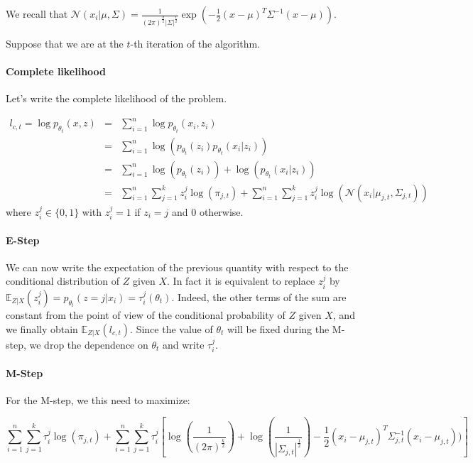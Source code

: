 \documentclass[12pt]{report}
\begin{document}
We recall that
$\mathcal{N}(x_i|\mu,\Sigma)=\frac{1}{(2\pi)^{\frac{d}{2}}|\Sigma|^{\frac{1}{2}}}\exp(-\frac{1}{2}(x-\mu)^T
\Sigma^{-1}(x-\mu))$.

\newpage
Suppose that we are at the $t$-th iteration of the algorithm.
\paragraph{Complete likelihood} Let's write the complete likelihood of the problem.

\begin{eqnarray*}
l_{c,t} = \log p_{\theta_t}(x,z) & = & \sum_{i=1}^n \log
p_{\theta_t}(x_i,z_i)\\
& = & \sum_{i=1}^n \log (p_{\theta_t}(z_i)p_{\theta_t}(x_i|z_i))\\
& = & \sum_{i=1}^n \log(p_{\theta_t}(z_i)) + \log(p_{\theta_t}(x_i|z_i))\\
& = & \sum_{i=1}^n \sum_{j=1}^k z^j_i \log(\pi_{j,t}) + \sum_{i=1}^n \sum_{j=1}^k z_i^j\log(\mathcal{N}(x_i|\mu_{j,t},\Sigma_{j,t}))
\end{eqnarray*}
where $z^j_i \in \{0,1\}$ with $z^j_i = 1$ if $z_i = j$ and $0$ otherwise. 
\paragraph{E-Step} We can now write the expectation of the previous quantity with respect to the conditional distribution of $Z$ given $X$. In fact it is equivalent to replace $z^j_i$ by $\mathbb{E}_{Z|X}(z^j_i)=p_{\theta_t}(z=j|x_i) = \tau^j_i(\theta_t)$. 
Indeed, the other terms of the sum are constant from the point of view of the conditional probability of $Z$ given $X$, and we finally obtain $\mathbb{E}_{Z|X}(l_{c,t})$. Since the value of $\theta_t$ will be fixed during the M-step, we drop the dependence on $\theta_t$ and write $\tau^j_i$. 

\paragraph{M-Step}
For the M-step, we this need to maximize:

\begin{equation*}
\sum_{i=1}^n \sum_{j=1}^k \tau_i^j \log(\pi_{j,t}) + \sum_{i=1}^n \sum_{j=1}^k \tau_i^j \left[\log(\frac{1}{(2\pi)^{\frac{k}{2}}})+\log(\frac{1}{|\Sigma_{j,t}|^{\frac{1}{2}}}) 
  - \frac{1}{2}(x_i-\mu_{j,t})^T \Sigma_{j,t}^{-1} (x_i-\mu_{j,t})) \right]  
\end{equation*}
\end{document}
